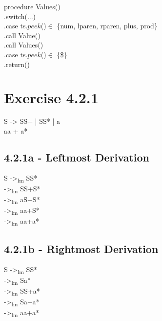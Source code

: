 \documentclass[letterpaper, 10pt,DIV=13]{scrartcl}
\numberwithin{equation}{section} %
\numberwithin{figure}{section} %
\numberwithin{table}{section} %
\begin{document}
procedure Values() \\
.\hspace{1cm}switch(...)\\
.\hspace{2cm}case ts.$peek$()$\in$ \{num, lparen, rparen, plus, prod\} \\
.\hspace{3cm}call Value() \\
.\hspace{3cm}call Values() \\
.\hspace{2cm}case ts.$peek$()$\in$ \{\$\} \\
.\hspace{3cm}return() \\


\pagebreak

\section{Exercise 4.2.1}

S -> SS+ | SS* | a \\
aa + a*

\subsection{4.2.1a - Leftmost Derivation}
S ->\textsubscript{lm} SS* \\
->\textsubscript{lm} SS+S* \\
->\textsubscript{lm} aS+S* \\
->\textsubscript{lm} aa+S* \\
->\textsubscript{lm} aa+a* \\

\subsection{4.2.1b - Rightmost Derivation}
S ->\textsubscript{lm} SS* \\
->\textsubscript{lm} Sa* \\
->\textsubscript{lm} SS+a* \\
->\textsubscript{lm} Sa+a* \\
->\textsubscript{lm} aa+a* \\
\end{document}

